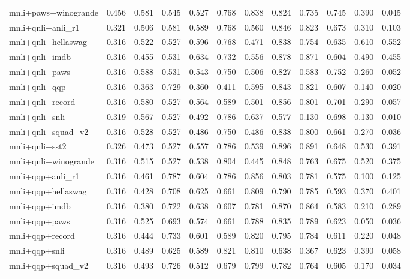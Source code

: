 \begin{table}[t]
\begin{tabular}{lrrrrrrrrrrr}
    mnli+paws+winogrande & 0.456 & 0.581 & 0.545 & 0.527 & 0.768 & 0.838 & 0.824 & 0.735 & 0.745 & 0.390 & 0.045 \\
    mnli+qnli+anli\_r1 & 0.321 & 0.506 & 0.581 & 0.589 & 0.768 & 0.560 & 0.846 & 0.823 & 0.673 & 0.310 & 0.103 \\
    mnli+qnli+hellaswag & 0.316 & 0.522 & 0.527 & 0.596 & 0.768 & 0.471 & 0.838 & 0.754 & 0.635 & 0.610 & 0.552 \\
    mnli+qnli+imdb & 0.316 & 0.455 & 0.531 & 0.634 & 0.732 & 0.556 & 0.878 & 0.871 & 0.604 & 0.490 & 0.455 \\
    mnli+qnli+paws & 0.316 & 0.588 & 0.531 & 0.543 & 0.750 & 0.506 & 0.827 & 0.583 & 0.752 & 0.260 & 0.052 \\
    mnli+qnli+qqp & 0.316 & 0.363 & 0.729 & 0.360 & 0.411 & 0.595 & 0.843 & 0.821 & 0.607 & 0.140 & 0.020 \\
    mnli+qnli+record & 0.316 & 0.580 & 0.527 & 0.564 & 0.589 & 0.501 & 0.856 & 0.801 & 0.701 & 0.290 & 0.057 \\
    mnli+qnli+snli & 0.319 & 0.567 & 0.527 & 0.492 & 0.786 & 0.637 & 0.577 & 0.130 & 0.698 & 0.130 & 0.010 \\
    mnli+qnli+squad\_v2 & 0.316 & 0.528 & 0.527 & 0.486 & 0.750 & 0.486 & 0.838 & 0.800 & 0.661 & 0.270 & 0.036 \\
    mnli+qnli+sst2 & 0.326 & 0.473 & 0.527 & 0.557 & 0.786 & 0.539 & 0.896 & 0.891 & 0.648 & 0.530 & 0.391 \\
    mnli+qnli+winogrande & 0.316 & 0.515 & 0.527 & 0.538 & 0.804 & 0.445 & 0.848 & 0.763 & 0.675 & 0.520 & 0.375 \\
    mnli+qqp+anli\_r1 & 0.316 & 0.461 & 0.787 & 0.604 & 0.786 & 0.856 & 0.803 & 0.781 & 0.575 & 0.100 & 0.125 \\
    mnli+qqp+hellaswag & 0.316 & 0.428 & 0.708 & 0.625 & 0.661 & 0.809 & 0.790 & 0.785 & 0.593 & 0.370 & 0.401 \\
    mnli+qqp+imdb & 0.316 & 0.380 & 0.722 & 0.638 & 0.607 & 0.781 & 0.870 & 0.864 & 0.583 & 0.210 & 0.289 \\
    mnli+qqp+paws & 0.316 & 0.525 & 0.693 & 0.574 & 0.661 & 0.788 & 0.835 & 0.789 & 0.623 & 0.050 & 0.036 \\
    mnli+qqp+record & 0.316 & 0.444 & 0.733 & 0.601 & 0.589 & 0.820 & 0.795 & 0.784 & 0.611 & 0.220 & 0.048 \\
    mnli+qqp+snli & 0.316 & 0.489 & 0.625 & 0.589 & 0.821 & 0.810 & 0.638 & 0.367 & 0.623 & 0.390 & 0.058 \\
    mnli+qqp+squad\_v2 & 0.316 & 0.493 & 0.726 & 0.512 & 0.679 & 0.799 & 0.782 & 0.764 & 0.605 & 0.170 & 0.034 \\

\end{tabular}
\end{table}

